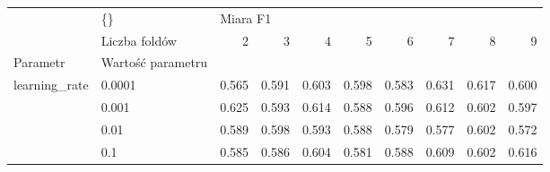 \begin{tabular}{llrrrrrrrr}
\hline
              & \{\} & \multicolumn{8}{l}{Miara F1} \\
              & Liczba foldów &        2 &      3 &      4 &      5 &      6 &      7 &      8 &      9 \\
Parametr & Wartość parametru &          &        &        &        &        &        &        &        \\
\hline
learning\_rate & 0.0001 &    0.565 &  0.591 &  0.603 &  0.598 &  0.583 &  0.631 &  0.617 &  0.600 \\
              & 0.001 &    0.625 &  0.593 &  0.614 &  0.588 &  0.596 &  0.612 &  0.602 &  0.597 \\
              & 0.01 &    0.589 &  0.598 &  0.593 &  0.588 &  0.579 &  0.577 &  0.602 &  0.572 \\
              & 0.1 &    0.585 &  0.586 &  0.604 &  0.581 &  0.588 &  0.609 &  0.602 &  0.616 \\
\hline
\end{tabular}
